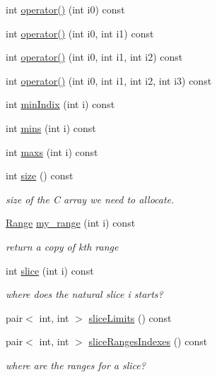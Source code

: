 \begin{DoxyCompactItemize}
\item 
int \hyperlink{classArrays_1_1CEngine_a3f698122d17d02eaf0fee40257fd0bf8}{operator()} (int i0) const 
\item 
int \hyperlink{classArrays_1_1CEngine_a69e6fe94bc87d4dbd5fab923add2346b}{operator()} (int i0, int i1) const 
\item 
int \hyperlink{classArrays_1_1CEngine_a6f3e58887e7089d20b5d73bf89a63be6}{operator()} (int i0, int i1, int i2) const 
\item 
int \hyperlink{classArrays_1_1CEngine_a76ee9361f4deb1a6499db4766263f3a1}{operator()} (int i0, int i1, int i2, int i3) const 
\item 
int \hyperlink{classArrays_1_1CEngine_a23085e105d866dcb7d520f804e844f58}{min\+Indix} (int i) const 
\item 
int \hyperlink{classArrays_1_1CEngine_a72e54156da142f41c62f6a02e803cca5}{mins} (int i) const 
\item 
int \hyperlink{classArrays_1_1CEngine_a67523478f8edb811cf6a1daf70938753}{maxs} (int i) const 
\item 
int \hyperlink{classArrays_1_1CEngine_a2c3560492a498811b802b56a88a00470}{size} () const 
\begin{DoxyCompactList}\small\item\em size of the C array we need to allocate. \end{DoxyCompactList}\item 
\hyperlink{structArrays_1_1Range}{Range} \hyperlink{classArrays_1_1CEngine_a8aa6ef522ec137c48316f2485285908c}{my\+\_\+range} (int i) const 
\begin{DoxyCompactList}\small\item\em return a copy of kth range \end{DoxyCompactList}\item 
int \hyperlink{classArrays_1_1CEngine_abde5931b6bb21d08c737f1627319cae6}{slice} (int i) const 
\begin{DoxyCompactList}\small\item\em where does the natural slice i starts? \end{DoxyCompactList}\item 
pair$<$ int, int $>$ \hyperlink{classArrays_1_1CEngine_a960e069a93e5d6e276ad7efc5da6d9d2}{slice\+Limits} () const 
\item 
pair$<$ int, int $>$ \hyperlink{classArrays_1_1CEngine_a8175b282b67790a972b316bc0c68fa62}{slice\+Ranges\+Indexes} () const 
\begin{DoxyCompactList}\small\item\em where are the ranges for a slice? \end{DoxyCompactList}\end{DoxyCompactItemize}
